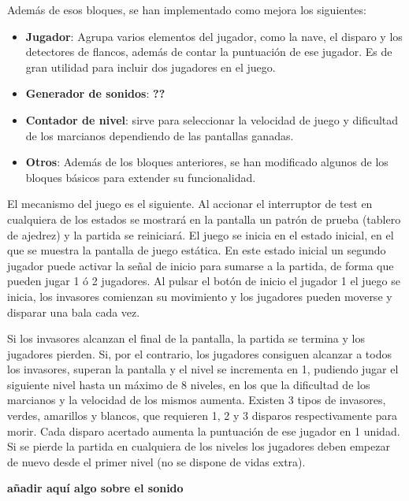 Además de esos bloques, se han implementado como mejora los siguientes:
\begin{itemize}
	\item {\bfseries Jugador}: Agrupa varios elementos del jugador, como la nave, el disparo y los detectores de flancos, además de contar la puntuación de ese jugador. Es de gran utilidad para incluir dos jugadores en el juego.
	\item {\bfseries Generador de sonidos}: {\bfseries ??}
	\item {\bfseries Contador de nivel}: sirve para seleccionar la velocidad de juego y dificultad de los marcianos dependiendo de las pantallas ganadas.
	\item {\bfseries Otros}: Además de los bloques anteriores, se han modificado algunos de los bloques básicos para extender su funcionalidad.
\end{itemize}

El mecanismo del juego es el siguiente. Al accionar el interruptor de test en cualquiera de los estados se mostrará en la pantalla un patrón de prueba (tablero de ajedrez) y la partida se reiniciará. El juego se inicia en el estado inicial, en el que se muestra la pantalla de juego estática. En este estado inicial un segundo jugador puede activar la señal de inicio para sumarse a la partida, de forma que pueden jugar 1 ó 2 jugadores. Al pulsar el botón de inicio el jugador 1 el juego se inicia, los invasores comienzan su movimiento y los jugadores pueden moverse y disparar una bala cada vez. 

Si los invasores alcanzan el final de la pantalla, la partida se termina y los jugadores pierden. Si, por el contrario, los jugadores consiguen alcanzar a todos los invasores, superan la pantalla y el nivel se incrementa en 1, pudiendo jugar el siguiente nivel hasta un máximo de 8 niveles, en los que la dificultad de los marcianos y la velocidad de los mismos aumenta. Existen 3 tipos de invasores, verdes, amarillos y blancos, que requieren 1, 2 y 3 disparos respectivamente para morir. Cada disparo acertado aumenta la puntuación de ese jugador en 1 unidad. Si se pierde la partida en cualquiera de los niveles los jugadores deben empezar de nuevo desde el primer nivel (no se dispone de vidas extra).

{\bfseries añadir aquí algo sobre el sonido}
\newpage
